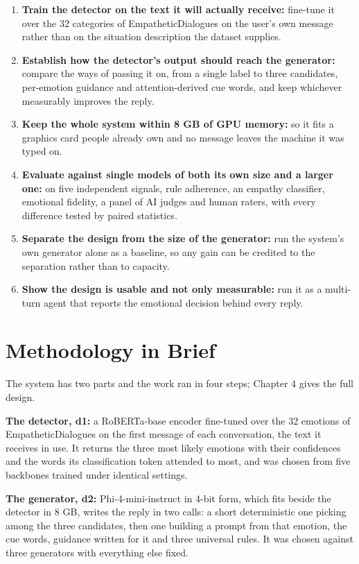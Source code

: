 \begin{enumerate}
  \item \textbf{Train the detector on the text it will actually receive:} fine-tune it over the 32 categories of EmpatheticDialogues on the user's own message rather than on the situation description the dataset supplies.
  \item \textbf{Establish how the detector's output should reach the generator:} compare the ways of passing it on, from a single label to three candidates, per-emotion guidance and attention-derived cue words, and keep whichever measurably improves the reply.
  \item \textbf{Keep the whole system within 8 GB of GPU memory:} so it fits a graphics card people already own and no message leaves the machine it was typed on.
  \item \textbf{Evaluate against single models of both its own size and a larger one:} on five independent signals, rule adherence, an empathy classifier, emotional fidelity, a panel of AI judges and human raters, with every difference tested by paired statistics.
  \item \textbf{Separate the design from the size of the generator:} run the system's own generator alone as a baseline, so any gain can be credited to the separation rather than to capacity.
  \item \textbf{Show the design is usable and not only measurable:} run it as a multi-turn agent that reports the emotional decision behind every reply.
\end{enumerate}

\section{Methodology in Brief}
\label{sec:1.5}

The system has two parts and the work ran in four steps; Chapter 4 gives the full design.

\textbf{The detector, d1:} a RoBERTa-base encoder fine-tuned over the 32 emotions of EmpatheticDialogues on the first message of each conversation, the text it receives in use. It returns the three most likely emotions with their confidences and the words its classification token attended to most, and was chosen from five backbones trained under identical settings.

\textbf{The generator, d2:} Phi-4-mini-instruct in 4-bit form, which fits beside the detector in 8 GB, writes the reply in two calls: a short deterministic one picking among the three candidates, then one building a prompt from that emotion, the cue words, guidance written for it and three universal rules. It was chosen against three generators with everything else fixed.

